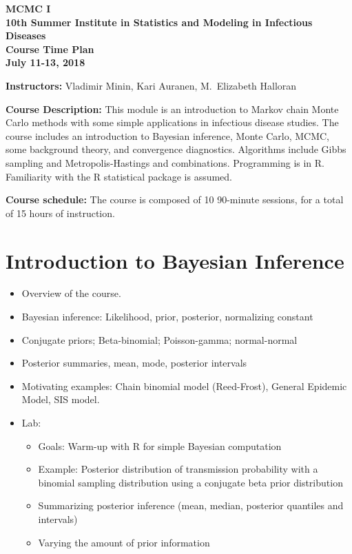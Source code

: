 \documentclass[11pt]{article}
\begin{document}

\addtolength{\baselineskip}{0.0\baselineskip}  
\pagestyle{myheadings} 

\begin{center}
{\bf  MCMC I \\
10th Summer Institute in Statistics and Modeling in Infectious Diseases \\
 Course Time Plan  \\
July 11-13, 2018}  
\end{center}

\vspace{.2cm}

\noindent
 {\bf Instructors:} Vladimir Minin,  Kari Auranen, M.\ Elizabeth Halloran\\

\vspace{.3cm}

\noindent
{\bf Course Description:} This module is an introduction to Markov chain Monte Carlo methods with some simple applications in infectious disease 
studies.  
 The course includes an introduction to 
 Bayesian inference, Monte Carlo, MCMC, some background theory, and convergence diagnostics. Algorithms include Gibbs sampling and Metropolis-Hastings and combinations. Programming is in R. 
 Familiarity with the R statistical package is assumed. 



\noindent
{\bf Course schedule:}
The course is composed of 10 90-minute sessions, for a total of 15 hours of instruction. 


\section{Introduction to Bayesian Inference} 
\begin{itemize} 
\item Overview of the course. 
\item Bayesian inference: Likelihood, prior, posterior, normalizing constant  
\item Conjugate priors; Beta-binomial; Poisson-gamma; normal-normal 
\item Posterior summaries, mean, mode,  posterior intervals   
\item Motivating examples: Chain binomial model (Reed-Frost), General Epidemic Model,  
SIS model.
\item {Lab: }
\begin{itemize}
\item Goals:  Warm-up with R for simple Bayesian computation
\item  Example: Posterior distribution of transmission probability with a binomial  sampling distribution using a conjugate beta prior distribution
\item Summarizing posterior inference (mean, median, posterior quantiles and intervals)
\item Varying the amount of prior information
\end{itemize}
\end{itemize}
\end{document}
